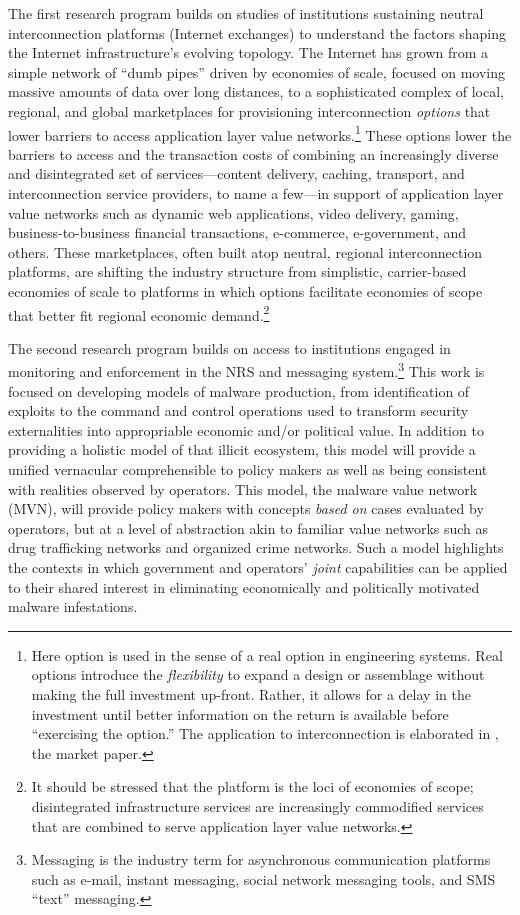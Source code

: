 \documentclass[12pt,journal,compsoc,letterpaper,onecolumn,twoside]{IEEEtran}
\begin{document}
The first research program builds on studies of institutions sustaining neutral
interconnection platforms (Internet exchanges) to understand the
factors shaping the Internet 
infrastructure's evolving topology.
%
The Internet has grown from a simple network of ``dumb pipes'' driven
by economies of scale, focused on moving massive amounts of data over
long distances, to a
sophisticated 
complex of local, regional, and global marketplaces for provisioning
interconnection \emph{options} that lower barriers to access
application layer value networks.\footnote{Here option is used in the
  sense of a real option in engineering systems.  Real options
  introduce the \emph{flexibility} to expand a design or assemblage
  without making the full investment up-front.  Rather, it allows for
  a delay in the investment until better information on the return is
  available before ``exercising the option.''  The application to
  interconnection is elaborated in , the market
  paper.}  
%
These options lower the barriers to access and the transaction costs
of combining an increasingly diverse and 
disintegrated set 
of services---content delivery, caching, transport, and interconnection service
providers, to name a few---in support of application layer value
networks such as 
dynamic web applications, video
delivery, gaming, business-to-business financial transactions,
e-commerce, e-government, and others.
%
These marketplaces, often built atop neutral, regional interconnection
platforms, are shifting the industry structure from simplistic, carrier-based
economies of scale to platforms in which options facilitate economies of
scope that better fit regional economic demand.\footnote{It should be stressed that the platform is the loci 
  of economies of scope; disintegrated infrastructure  services are
  increasingly 
  commodified services that are combined to serve application layer
  value networks.}
%

%
The second research program builds on access to institutions engaged
in monitoring and
enforcement in the NRS and messaging system.\footnote{Messaging is the
  industry term for asynchronous communication platforms such as
  e-mail, instant messaging, social network messaging tools, and SMS
  ``text'' messaging.}  
%
This work is focused on developing models of malware
production, from identification of exploits to the command and
control operations used to transform security externalities into appropriable
economic and/or political value.
%
In addition to providing a holistic model of that illicit ecosystem,
this model will provide a  unified vernacular comprehensible to policy makers
as well as being consistent with realities observed by operators.
%
This model, the malware value network (MVN), will provide
policy makers 
with concepts \emph{based on} cases evaluated by operators, but
at a level of abstraction akin to familiar value networks such as  drug
trafficking networks and organized crime networks.
%
Such a model  highlights the
contexts in which government and operators' \emph{joint} capabilities can be 
applied to their shared interest in eliminating economically and politically
motivated malware infestations.
%
%
\end{document}
